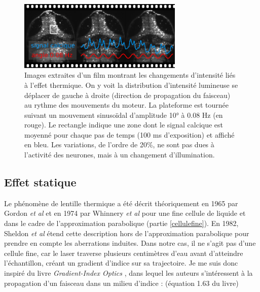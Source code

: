 
\begin{figure}
\centering
\includegraphics[width=0.7\textwidth]{./files/water_instability.svg.png}
\caption{Images extraites d'un film montrant les changements d'intensité liés à l'effet thermique. On y voit la distribution d'intensité lumineuse se déplacer de gauche à droite (direction de propagation du faisceau) au rythme des mouvements du moteur. La plateforme est tournée suivant un mouvement sinusoïdal d'amplitude 10° à 0.08 Hz (en rouge). Le rectangle indique une zone dont le signal calcique est moyenné pour chaque pas de temps (100 ms d'exposition) et affiché en bleu. Les variations, de l'ordre de 20\%, ne sont pas dues à l'activité des neurones, mais à un changement d'illumination.
\label{FIGwaterinstability}}
\end{figure}




\subsection{Effet statique}


Le phénomène de lentille thermique a été décrit théoriquement en 1965 par Gordon \emph{et al} \cite{gordon_longtransient_1965} et en 1974 par Whinnery \emph{et al} \cite{whinnery_laser_1974} pour une fine cellule de liquide et dans le cadre de l'approximation parabolique (partie \ref{cellulefine}). En 1982, Sheldon \emph{et al} \cite{sheldon_laser-induced_1982} étend cette description hors de l'approximation parabolique pour prendre en compte les aberrations induites. Dans notre cas, il ne s'agit pas d'une cellule fine, car le laser traverse plusieurs centimètres d'eau avant d'atteindre l'échantillon, créant un gradient d'indice sur sa trajectoire. Je me suis donc inspiré du livre \emph{Gradient-Index Optics} \cite{gomez-reino_gradient-index_2002}, dans lequel les auteurs s'intéressent à la propagation d'un faisceau dans un milieu d'indice : (équation 1.63 du livre)

